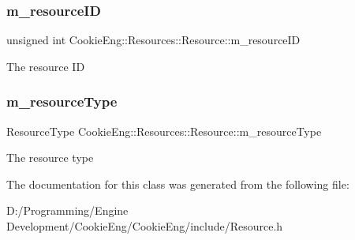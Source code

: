 \subsubsection{\texorpdfstring{m\+\_\+resource\+ID}{m\_resourceID}}
{\footnotesize\ttfamily unsigned int Cookie\+Eng\+::\+Resources\+::\+Resource\+::m\+\_\+resource\+ID\hspace{0.3cm}{\ttfamily [protected]}}

The resource ID \mbox{\label{class_cookie_eng_1_1_resources_1_1_resource_a3740fe0571f4d65ddf71c36df0d8490c}} 
\subsubsection{\texorpdfstring{m\+\_\+resource\+Type}{m\_resourceType}}
{\footnotesize\ttfamily Resource\+Type Cookie\+Eng\+::\+Resources\+::\+Resource\+::m\+\_\+resource\+Type\hspace{0.3cm}{\ttfamily [protected]}}

The resource type 

The documentation for this class was generated from the following file\+:\begin{DoxyCompactItemize}
\item 
D\+:/\+Programming/\+Engine Development/\+Cookie\+Eng/\+Cookie\+Eng/include/Resource.\+h\end{DoxyCompactItemize}

